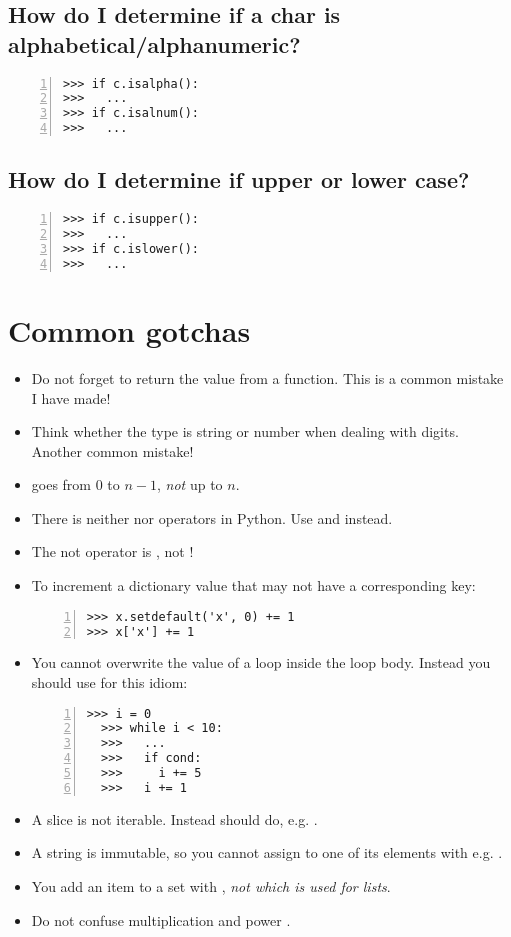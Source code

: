 \documentclass[12pt]{article}
\begin{document}
\subsection{How do I determine if a char is alphabetical/alphanumeric?}
\begin{lstlisting}[numbers=left]
>>> if c.isalpha():
>>>   ...
>>> if c.isalnum():
>>>   ...
\end{lstlisting}

\subsection{How do I determine if upper or lower case?}
\begin{lstlisting}[numbers=left]
>>> if c.isupper():
>>>   ...
>>> if c.islower():
>>>   ...
\end{lstlisting}

\section{Common gotchas}
\begin{itemize}
\item Do not forget to return the value from a function. This is a common mistake I have made!
\item Think whether the type is string or number when dealing with digits. Another common mistake!
\item {} goes from $0$ to $n-1$, \emph{not} up to $n$.
\item There is neither \python{++} nor \python{--} operators in Python. Use  and  instead.
\item The not operator is , not !
\item To increment a dictionary value that may not have a corresponding key:

\begin{lstlisting}[numbers=left]
>>> x.setdefault('x', 0) += 1
>>> x['x'] += 1
\end{lstlisting}
\item You cannot overwrite the value of a  loop inside the loop body. Instead you should use  for this idiom:

\begin{lstlisting}[numbers=left]
  >>> i = 0
  >>> while i < 10:
  >>>   ...
  >>>   if cond:
  >>>     i += 5
  >>>   i += 1
  \end{lstlisting}
\item A slice is not iterable. Instead should do, e.g. .
\item A string is immutable, so you cannot assign to one of its elements with e.g. .
\item You add an item to a set with , \emph{not  which is used for lists}.
\item Do not confuse multiplication \python{*} and power \python{**}.
\end{itemize}

%
%
\end{document}
